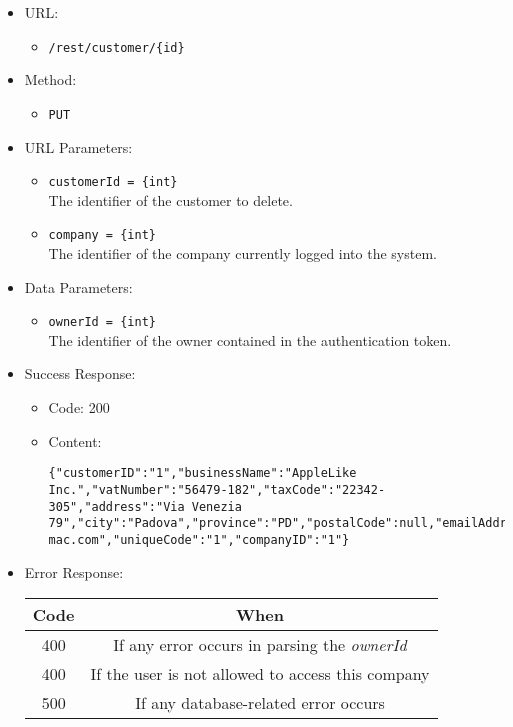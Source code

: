 \begin{itemize}

    \item URL:
    \begin{itemize}
        \item \texttt{/rest/customer/\{id\}}
    \end{itemize}

    \item Method:
    \begin{itemize}
        \item \texttt{PUT}
    \end{itemize}

    \item URL Parameters:
    \begin{itemize}
        \item \texttt{customerId = \{int\}} \\
        The identifier of the customer to delete.
        \item \texttt{company = \{int\}} \\
        The identifier of the company currently logged into the system.
    \end{itemize}

    \item Data Parameters:
    \begin{itemize}
        \item \texttt{ownerId = \{int\}} \\
        The identifier of the owner contained in the authentication token.
    \end{itemize}

    \item Success Response:
    \begin{itemize}
        \item Code: 200
        \item Content:
        \begin{lstlisting}
{"customerID":"1","businessName":"AppleLike Inc.","vatNumber":"56479-182","taxCode":"22342-305","address":"Via Venezia 79","city":"Padova","province":"PD","postalCode":null,"emailAddress":"applelike@google.com","pec":"applelike@pec-mac.com","uniqueCode":"1","companyID":"1"}
        \end{lstlisting}
    \end{itemize}

    \item Error Response:
    \begin{table}[!h]
    \centering
    \begin{tabular}{|c|c|}
    \hline
    \multicolumn{1}{|c|}{\textbf{Code}} & \multicolumn{1}{c|}{\textbf{When}} \\ \hline
    400 & If any error occurs in parsing the \textit{ownerId}  \\\hline
    400 & If the user is not allowed to access this company \\\hline
    500 & If any database-related error occurs \\\hline
    \end{tabular}
    \end{table}

\end{itemize}



